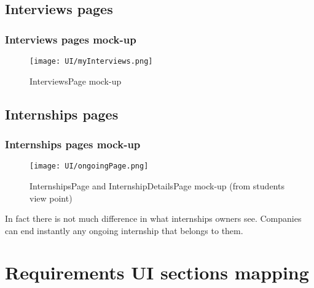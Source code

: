 	\subsection{Interviews pages}
	\subsubsection{Interviews pages mock-up}
	\begin{figure}[H]
		\centering
		\caption{InterviewsPage mock-up}
		\texttt{[image: UI/myInterviews.png]}
	\end{figure}
	\subsection{Internships pages}
	\subsubsection{Internships pages mock-up}
	\begin{figure}[H]
		\centering
		\caption{InternshipsPage and InternshipDetailsPage mock-up (from students view point)}
		\texttt{[image: UI/ongoingPage.png]}
	\end{figure}
	In fact there is not much difference in what internships owners see. Companies can end instantly any ongoing internship that belongs to them.
	\section{Requirements UI sections mapping}
